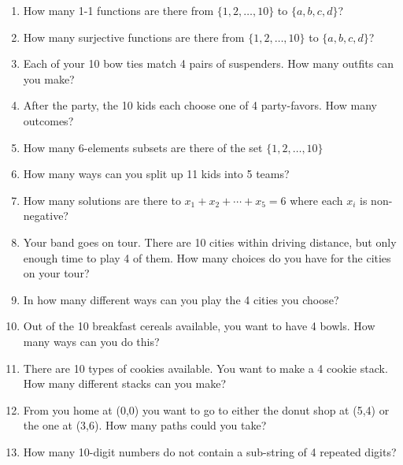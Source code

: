\documentclass[10pt,]{book}
\theoremstyle{plain}
\theoremstyle{definition}
\theoremstyle{definition}
\theoremstyle{definition}
\numberwithin{equation}{chapter}
\begin{document}
\begin{exerciselist}
\begin{enumerate}[label=(\alph*)]
\item\hypertarget{li-680}{}
                How many 1-1 functions are there from \(\{1,2,\ldots, 10\}\) to \(\{a,b,c,d\}\)?
\item\hypertarget{li-681}{}
                How many surjective functions are there from \(\{1,2,\ldots, 10\}\) to \(\{a,b,c,d\}\)?
\item\hypertarget{li-682}{}
                Each of your 10 bow ties match 4 pairs of suspenders. How many outfits can you make?
\item\hypertarget{li-683}{}
                After the party, the 10 kids each choose one of 4 party-favors. How many outcomes?
\item\hypertarget{li-684}{}
                How many 6-elements subsets are there of the set \(\{1,2,\ldots, 10\}\)
\item\hypertarget{li-685}{}
                How many ways can you split up 11 kids into 5 teams?
\item\hypertarget{li-686}{}
                How many solutions are there to \(x_1 + x_2 + \cdots + x_5 = 6\) where each \(x_i\) is non-negative?
\item\hypertarget{li-687}{}
                Your band goes on tour. There are 10 cities within driving distance, but only enough time to play 4 of them. How many choices do you have for the cities on your tour?
\item\hypertarget{li-688}{}
                In how many different ways can you play the 4 cities you choose?
\item\hypertarget{li-689}{}
                Out of the 10 breakfast cereals available, you want to have 4 bowls. How many ways can you do this?
\item\hypertarget{li-690}{}
                There are 10 types of cookies available. You want to make a 4 cookie stack. How many different stacks can you make?
\item\hypertarget{li-691}{}
                From you home at (0,0) you want to go to either the donut shop at (5,4) or the one at (3,6). How many paths could you take?
\item\hypertarget{li-692}{}
                How many 10-digit numbers do not contain a sub-string of 4 repeated digits?
\end{enumerate}


\end{exerciselist}
\end{document}
